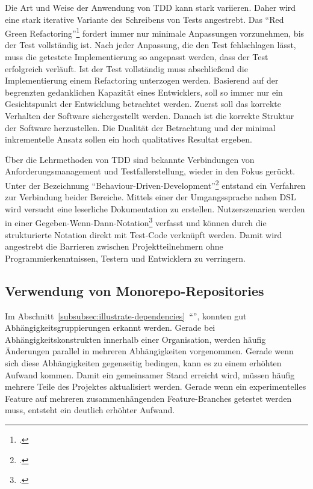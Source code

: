 Die Art und Weise der Anwendung von TDD kann stark variieren. Daher wird eine stark iterative Variante des Schreibens von Tests angestrebt. Das ``Red Green Refactoring''\footcite[vgl.][Kap. 
Red-Green-Refactor
]{tdd-java} fordert immer nur minimale Anpassungen vorzunehmen, bis der Test vollständig ist. Nach jeder Anpassung, die den Test fehlschlagen lässt, muss die getestete Implementierung so angepasst werden, dass der Test erfolgreich verläuft. Ist der Test vollständig muss abschließend die Implementierung einem Refactoring unterzogen werden. Basierend auf der begrenzten gedanklichen Kapazität eines Entwicklers, soll so immer nur ein Gesichtspunkt der Entwicklung betrachtet werden. Zuerst soll das korrekte Verhalten der Software sichergestellt werden. Danach ist die korrekte Struktur der Software herzustellen. Die Dualität der Betrachtung und der minimal inkrementelle Ansatz sollen ein hoch qualitatives Resultat ergeben.

Über die Lehrmethoden von TDD sind bekannte Verbindungen von Anforderungsmanagement und Testfallerstellung, wieder in den Fokus gerückt. Unter der Bezeichnung ``Behaviour-Driven-Development''\footcite{bdd-north} entstand ein Verfahren zur Verbindung beider Bereiche. Mittels einer der Umgangssprache nahen DSL wird versucht eine leserliche Dokumentation zu erstellen. Nutzerszenarien werden in einer Gegeben-Wenn-Dann-Notation\footcite{fowler-gwt} verfasst und können durch die strukturierte Notation direkt mit Test-Code verknüpft werden. Damit wird angestrebt die Barrieren zwischen Projektteilnehmern ohne Programmierkenntnissen, Testern und Entwicklern zu verringern.

\subsection{Verwendung von Monorepo-Repositories}

Im Abschnitt~\ref{subsubsec:illustrate-dependencies}~``'', konnten gut Abhängigkeitsgruppierungen erkannt werden. Gerade bei Abhängigkeitskonstrukten innerhalb einer Organisation, werden häufig Änderungen parallel in mehreren Abhängigkeiten vorgenommen. Gerade wenn sich diese Abhängigkeiten gegenseitig bedingen, kann es zu einem erhöhten Aufwand kommen. Damit ein gemeinsamer Stand erreicht wird, müssen häufig mehrere Teile des Projektes aktualisiert werden. Gerade wenn ein experimentelles Feature auf mehreren zusammenhängenden Feature-Branches getestet werden muss, entsteht ein deutlich erhöhter Aufwand.


